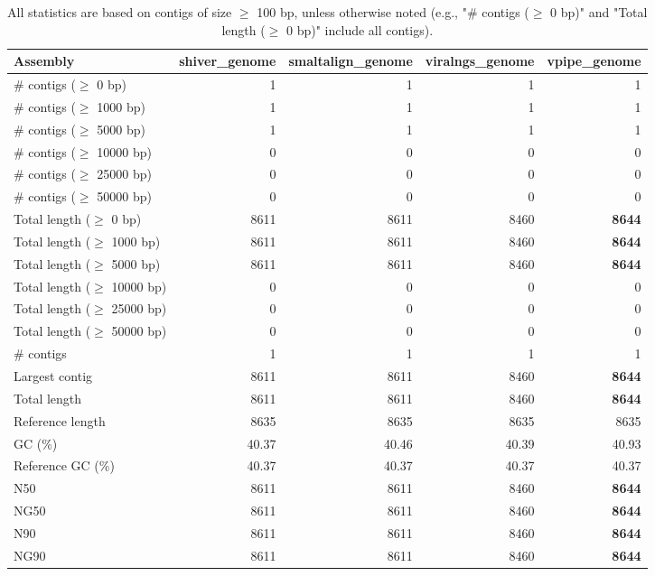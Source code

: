 \documentclass[12pt,a4paper]{article}
\begin{document}
\begin{table}[ht]
\begin{center}
\caption{All statistics are based on contigs of size $\geq$ 100 bp, unless otherwise noted (e.g., "\# contigs ($\geq$ 0 bp)" and "Total length ($\geq$ 0 bp)" include all contigs).}
\begin{tabular}{|l*{4}{|r}|}
\hline
Assembly & shiver\_genome & smaltalign\_genome & viralngs\_genome & vpipe\_genome \\ \hline
\# contigs ($\geq$ 0 bp) & 1 & 1 & 1 & 1 \\ \hline
\# contigs ($\geq$ 1000 bp) & 1 & 1 & 1 & 1 \\ \hline
\# contigs ($\geq$ 5000 bp) & 1 & 1 & 1 & 1 \\ \hline
\# contigs ($\geq$ 10000 bp) & 0 & 0 & 0 & 0 \\ \hline
\# contigs ($\geq$ 25000 bp) & 0 & 0 & 0 & 0 \\ \hline
\# contigs ($\geq$ 50000 bp) & 0 & 0 & 0 & 0 \\ \hline
Total length ($\geq$ 0 bp) & 8611 & 8611 & 8460 & {\bf 8644} \\ \hline
Total length ($\geq$ 1000 bp) & 8611 & 8611 & 8460 & {\bf 8644} \\ \hline
Total length ($\geq$ 5000 bp) & 8611 & 8611 & 8460 & {\bf 8644} \\ \hline
Total length ($\geq$ 10000 bp) & 0 & 0 & 0 & 0 \\ \hline
Total length ($\geq$ 25000 bp) & 0 & 0 & 0 & 0 \\ \hline
Total length ($\geq$ 50000 bp) & 0 & 0 & 0 & 0 \\ \hline
\# contigs & 1 & 1 & 1 & 1 \\ \hline
Largest contig & 8611 & 8611 & 8460 & {\bf 8644} \\ \hline
Total length & 8611 & 8611 & 8460 & {\bf 8644} \\ \hline
Reference length & 8635 & 8635 & 8635 & 8635 \\ \hline
GC (\%) & 40.37 & 40.46 & 40.39 & 40.93 \\ \hline
Reference GC (\%) & 40.37 & 40.37 & 40.37 & 40.37 \\ \hline
N50 & 8611 & 8611 & 8460 & {\bf 8644} \\ \hline
NG50 & 8611 & 8611 & 8460 & {\bf 8644} \\ \hline
N90 & 8611 & 8611 & 8460 & {\bf 8644} \\ \hline
NG90 & 8611 & 8611 & 8460 & {\bf 8644} \\ \hline

\end{tabular}
\end{center}
\end{table}
\end{document}
